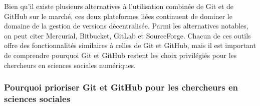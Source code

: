 \documentclass[
  letterpaper,
  DIV=11,
  numbers=noendperiod]{scrreprt}
\begin{document}
Bien qu'il existe plusieurs alternatives à l'utilisation combinée de Git
et de GitHub sur le marché, ces deux plateformes liées continuent de
dominer le domaine de la gestion de versions décentralisée. Parmi les
alternatives notables, on peut citer Mercurial, Bitbucket, GitLab et
SourceForge. Chacun de ces outils offre des fonctionnalités similaires à
celles de Git et GitHub, mais il est important de comprendre pourquoi
Git et GitHub restent les choix privilégiés pour les chercheurs en
sciences sociales numériques.

\subsubsection{Pourquoi prioriser Git et GitHub pour les chercheurs en
sciences
sociales}\label{pourquoi-prioriser-git-et-github-pour-les-chercheurs-en-sciences-sociales}
\end{document}
